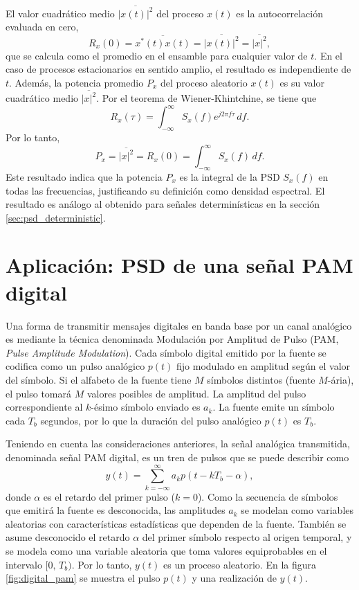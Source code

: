 \documentclass[a4paper]{article}
\begin{document}
El valor cuadrático medio \(\overline{|x(t)|^2}\) del proceso \(x(t)\) es la autocorrelación evaluada en cero,
\[
 R_x(0)=\overline{x^*(t)x(t)}=\overline{|x(t)|^2}=\overline{|x|^2},
\]
que se calcula como el promedio en el ensamble para cualquier valor de \(t\). En el caso de procesos estacionarios en sentido amplio, el resultado es independiente de \(t\). Además, la potencia promedio \(P_x\) del proceso aleatorio \(x(t)\) es su valor cuadrático medio \(\overline{|x|^2}\). Por el teorema de Wiener-Khintchine, se tiene que
\[
 R_x(\tau) = \int_{-\infty}^{\infty}S_x(f)e^{j2\pi f\tau}\,df.
\]
Por lo tanto,
\[
 P_x = \overline{|x|^2} =  R_x(0) = \int_{-\infty}^{\infty}S_x(f)\,df.
\]
Este resultado indica que la potencia \(P_x\) es la integral de la PSD \(S_x(f)\) en todas las frecuencias, justificando su definición como densidad espectral. El resultado es análogo al obtenido para señales determinísticas en la sección \ref{sec:psd_deterministic}.

\section{Aplicación: PSD de una señal PAM digital}\label{sec:pam_psd}

Una forma de transmitir mensajes digitales en banda base por un canal analógico es mediante la técnica denominada Modulación por Amplitud de Pulso (PAM, \emph{Pulse Amplitude Modulation}). Cada símbolo digital emitido por la fuente se codifica como un pulso analógico \(p(t)\) fijo modulado en amplitud según el valor del símbolo. Si el alfabeto de la fuente tiene \(M\) símbolos distintos (fuente \(M\)-ária), el pulso tomará \(M\) valores posibles de amplitud. La amplitud del pulso correspondiente al \(k\)-ésimo símbolo enviado es \(a_k\). La fuente emite un símbolo cada \(T_b\) segundos, por lo que la duración del pulso analógico \(p(t)\) es \(T_b\).

Teniendo en cuenta las consideraciones anteriores, la señal analógica transmitida, denominada señal PAM digital, es un tren de pulsos que se puede describir como
\begin{equation}\label{eq:digital_pam_process}
y(t)= \sum_{k=-\infty}^{\infty}a_kp(t-kT_b-\alpha),
\end{equation}
donde \(\alpha\) es el retardo del primer pulso (\(k=0\)). Como la secuencia de símbolos que emitirá la fuente es desconocida, las amplitudes \(a_k\) se modelan como variables aleatorias con características estadísticas que dependen de la fuente. También se asume desconocido el retardo \(\alpha\) del primer símbolo respecto al origen temporal, y se modela como una variable aleatoria que toma valores equiprobables en el intervalo \([0,\, T_b)\). Por lo tanto, \(y(t)\) es un proceso aleatorio. En la figura \ref{fig:digital_pam} se muestra el pulso \(p(t)\) y una realización de \(y(t)\).
\end{document}
